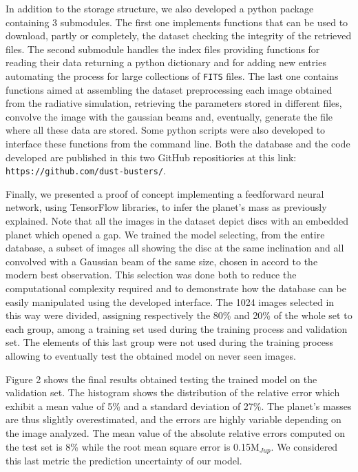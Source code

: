 \documentclass[a4paper,10pt, margin=1cm]{article}
\begin{document}
In addition to the storage structure, we also developed a python package containing 3 submodules. 
The first one implements functions that can be used to download, partly or completely, the dataset
checking the integrity of the retrieved files.
The second submodule handles the index files providing functions for reading their data
returning a python dictionary and for adding new entries 
automating the process for large collections of \lstinline{FITS} files.
The last one contains functions aimed at assembling the dataset 
preprocessing each image obtained 
from the radiative simulation, retrieving the parameters stored in different files,
convolve the image with the gaussian beams and, eventually, generate the file where all these data are stored.
Some python scripts were also developed to interface these functions from the command line.
Both the database and the code developed are published in this two GitHub repositiories at this link: \lstinline{https://github.com/dust-busters/}.

Finally, we presented a proof of concept implementing a feedforward
neural network, using TensorFlow libraries, to infer the planet's mass as previously explained.
Note that all the images in the dataset depict discs with an embedded planet which opened a gap.
We trained the model selecting, from the entire database,
a subset of images all showing the disc at the same inclination and all convolved with a Gaussian beam of the same size,
chosen in accord to the modern best observation. This selection was done both to reduce the
computational complexity required and to demonstrate how the database can be easily manipulated using the
developed interface. The 1024 images selected in this way were divided, assigning respectively the 80\% and 20\% of the whole set to each group,
among a training set used during the training process
and validation set. The elements of this last group were not used during the training process allowing to eventually test the obtained model 
on never seen images. 

Figure 2 shows the final results obtained testing the trained model on the validation set. The histogram shows the
distribution of the relative error which exhibit a mean value of 5\% and a standard deviation of 27\%.
The planet's masses are thus slightly overestimated, and the errors are highly variable depending on the image analyzed.
The mean value of the absolute relative errors computed on the test set is 8\% while the root mean square error is
0.15M$_{Jup}$. We considered this last metric the prediction uncertainty of our model.
\end{document}
